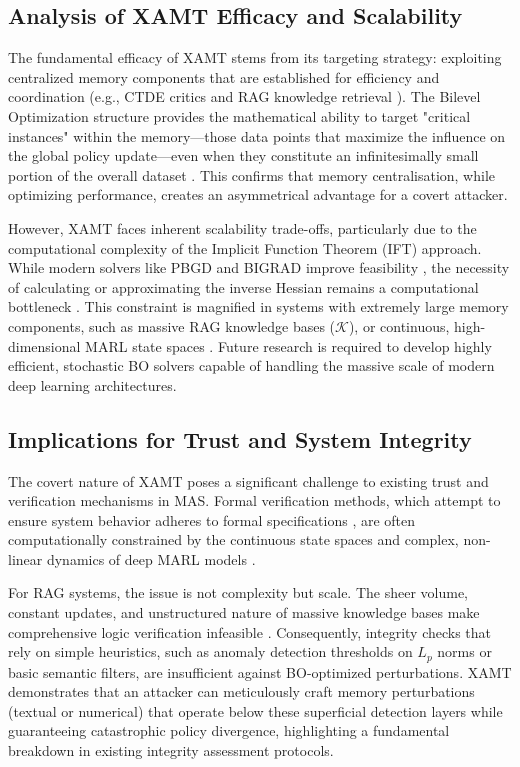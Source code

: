 \documentclass[conference]{IEEEtran}
\begin{document}
\subsection{Analysis of XAMT Efficacy and Scalability}
The fundamental efficacy of XAMT stems from its targeting strategy: exploiting centralized memory components that are established for efficiency and coordination (e.g., CTDE critics \cite{Ref6} and RAG knowledge retrieval \cite{Ref42}). The Bilevel Optimization structure provides the mathematical ability to target "critical instances" within the memory—those data points that maximize the influence on the global policy update—even when they constitute an infinitesimally small portion of the overall dataset \cite{Ref20, Ref49}. This confirms that memory centralisation, while optimizing performance, creates an asymmetrical advantage for a covert attacker.

However, XAMT faces inherent scalability trade-offs, particularly due to the computational complexity of the Implicit Function Theorem (IFT) approach. While modern solvers like PBGD and BIGRAD improve feasibility \cite{Ref22, Ref23}, the necessity of calculating or approximating the inverse Hessian remains a computational bottleneck \cite{Ref39}. This constraint is magnified in systems with extremely large memory components, such as massive RAG knowledge bases ($\mathcal{K}$), or continuous, high-dimensional MARL state spaces \cite{Ref50, Ref51}. Future research is required to develop highly efficient, stochastic BO solvers capable of handling the massive scale of modern deep learning architectures.

\subsection{Implications for Trust and System Integrity}
The covert nature of XAMT poses a significant challenge to existing trust and verification mechanisms in MAS. Formal verification methods, which attempt to ensure system behavior adheres to formal specifications \cite{Ref52}, are often computationally constrained by the continuous state spaces and complex, non-linear dynamics of deep MARL models \cite{Ref50}.

For RAG systems, the issue is not complexity but scale. The sheer volume, constant updates, and unstructured nature of massive knowledge bases make comprehensive logic verification infeasible \cite{Ref33, Ref35}. Consequently, integrity checks that rely on simple heuristics, such as anomaly detection thresholds on $L_p$ norms or basic semantic filters, are insufficient against BO-optimized perturbations. XAMT demonstrates that an attacker can meticulously craft memory perturbations (textual or numerical) that operate below these superficial detection layers while guaranteeing catastrophic policy divergence, highlighting a fundamental breakdown in existing integrity assessment protocols.
\end{document}
